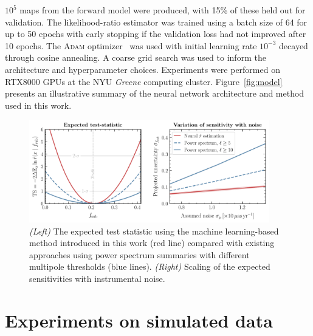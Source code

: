 \documentclass[]{article}
\begin{document}
$10^5$ maps from the forward model were produced, with 15\% of these held out for validation. The likelihood-ratio estimator was trained using a batch size of 64 for up to 50 epochs with early stopping if the validation loss had not improved after 10 epochs. The \textsc{Adam} optimizer~\citep{kingma2017adam} was used with initial learning rate $10^{-3}$ decayed through cosine annealing. A coarse grid search was used to inform the architecture and hyperparameter choices. Experiments were performed on RTX8000 GPUs at the NYU \emph{Greene} computing cluster.
Figure~\ref{fig:model} presents an illustrative summary of the neural network architecture and method used in this work. 

\begin{figure}[!htbp]
\centering
\includegraphics[width=0.93\textwidth]{figures/results}
\caption{\emph{(Left)} The expected test statistic using the machine learning-based method introduced in this work (red line) compared with existing approaches using power spectrum summaries with different multipole thresholds (blue lines). \emph{(Right)} Scaling of the expected sensitivities with instrumental noise.}
\label{fig:experiment}
\end{figure}
 
\section{Experiments on simulated data}
\label{sec:experiments}
\end{document}
